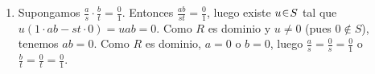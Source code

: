 \begin{sol}[Demostración]
\begin{enumerate}[label=(\alph*)]
\item Supongamos $\frac{a}{s} \cdot \frac{b}{t} = \frac{0}{1}$. Entonces $\frac{ab}{st} = \frac{0}{1}$, luego existe $u \en S$ tal que $u(1\cdot ab - st\cdot 0) = uab = 0$. Como $R$ es dominio y $u \neq 0$ (pues $0 \notin S$), tenemos $ab = 0$. Como $R$ es dominio, $a = 0$ o $b = 0$, luego $\frac{a}{s} = \frac{0}{s} = \frac{0}{1}$ o $\frac{b}{t} = \frac{0}{t} = \frac{0}{1}$.
\end{enumerate}
\end{sol}


